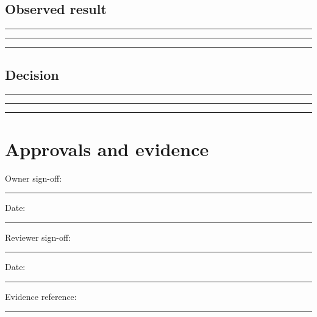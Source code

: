 \documentclass[11pt]{article}
\begin{document}
\subsection{Observed result}
\noindent\rule{\linewidth}{0.3pt}\par\vspace{0.18in}
\noindent\rule{\linewidth}{0.3pt}\par\vspace{0.18in}
\noindent\rule{\linewidth}{0.3pt}\par\vspace{0.14in}

\subsection{Decision}
\noindent\rule{\linewidth}{0.3pt}\par\vspace{0.18in}
\noindent\rule{\linewidth}{0.3pt}\par\vspace{0.18in}
\noindent\rule{\linewidth}{0.3pt}\par\vspace{0.14in}

\section{Approvals and evidence}
\noindent Owner sign-off: \rule{0.42\linewidth}{0.4pt}\hfill Date: \rule{0.19\linewidth}{0.4pt}\par\vspace{0.4cm}
\noindent Reviewer sign-off: \rule{0.40\linewidth}{0.4pt}\hfill Date: \rule{0.19\linewidth}{0.4pt}\par\vspace{0.4cm}
\noindent Evidence reference: \rule{0.70\linewidth}{0.4pt}
\end{document}
